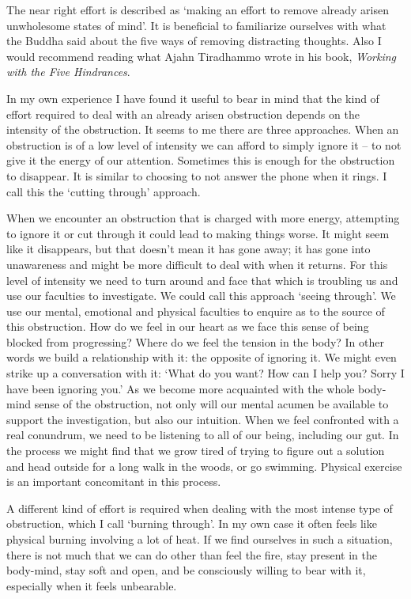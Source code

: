 The near right effort is described as `making an effort to remove
already arisen unwholesome states of mind'. It is beneficial to
familiarize ourselves with what the Buddha said about the five ways of
removing distracting thoughts\cite{thoughts}. Also I
would recommend reading what Ajahn Tiradhammo wrote in his book,
\emph{Working with the Five Hindrances}\cite{hindrances}.

In my own experience I have found it useful to bear in mind that the
kind of effort required to deal with an already arisen obstruction
depends on the intensity of the obstruction. It seems to me there are
three approaches. When an obstruction is of a low level of intensity we
can afford to simply ignore it -- to not give it the energy of our
attention. Sometimes this is enough for the obstruction to disappear. It
is similar to choosing to not answer the phone when it rings. I call
this the `cutting through' approach.

When we encounter an obstruction that is charged with more energy,
attempting to ignore it or cut through it could lead to making things
worse. It might seem like it disappears, but that doesn't mean it has
gone away; it has gone into unawareness and might be more difficult to
deal with when it returns. For this level of intensity we need to turn
around and face that which is troubling us and use our faculties to
investigate. We could call this approach `seeing through'. We use our
mental, emotional and physical faculties to enquire as to the source of
this obstruction. How do we feel in our heart as we face this sense of
being blocked from progressing? Where do we feel the tension in the
body? In other words we build a relationship with it: the opposite of
ignoring it. We might even strike up a conversation with it: `What do
you want? How can I help you? Sorry I have been ignoring you.' As we
become more acquainted with the whole body-mind sense of the
obstruction, not only will our mental acumen be available to support the
investigation, but also our intuition. When we feel confronted with a
real conundrum, we need to be listening to all of our being, including
our gut. In the process we might find that we grow tired of trying to
figure out a solution and head outside for a long walk in the woods, or
go swimming. Physical exercise is an important concomitant in this
process.

A different kind of effort is required when dealing with the most
intense type of obstruction, which I call `burning through'. In my own
case it often feels like physical burning involving a lot of heat. If we
find ourselves in such a situation, there is not much that we can do
other than feel the fire, stay present in the body-mind, stay soft and
open, and be consciously willing to bear with it, especially when it
feels unbearable.

